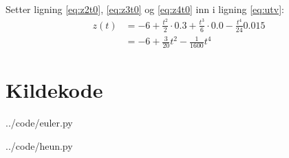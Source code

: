 Setter ligning \eqref{eq:z2t0}, \eqref{eq:z3t0} og \eqref{eq:z4t0} inn i ligning \eqref{eq:utv}:
\begin{align}
  z(t) &= -6 + \frac{t^2}{2} \cdot 0.3
        + \frac{t^3}{6} \cdot 0.0
        - \frac{t^4}{24} 0.015 \\
       &= -6 + \frac{3}{20} t^2
        - \frac{1}{1600} t^4
\end{align}





\clearpage
\section{Kildekode} %
\label{sec:kildekode}


  {../code/euler.py}


  {../code/heun.py}












